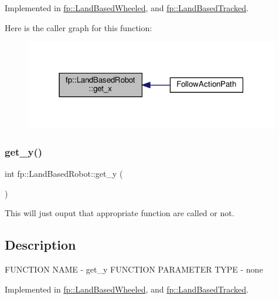 Implemented in \hyperlink{classfp_1_1_land_based_wheeled_a75cb4df0270397db3a019f1abc694cf9}{fp\+::\+Land\+Based\+Wheeled}, and \hyperlink{classfp_1_1_land_based_tracked_a3a4fc3c84dd3fcf1928a27af1658680f}{fp\+::\+Land\+Based\+Tracked}.

Here is the caller graph for this function\+:
\nopagebreak
\begin{figure}[H]
\begin{center}
\leavevmode
\includegraphics[width=315pt]{classfp_1_1_land_based_robot_a3624c5d041de0987c0103c6b01fa9bc6_icgraph}
\end{center}
\end{figure}
\mbox{\label{classfp_1_1_land_based_robot_ae742797bee07ac5b92bfe934cbfed6e9}} 
\subsubsection{\texorpdfstring{get\+\_\+y()}{get\_y()}}
{\footnotesize\ttfamily int fp\+::\+Land\+Based\+Robot\+::get\+\_\+y (\begin{DoxyParamCaption}{ }\end{DoxyParamCaption})\hspace{0.3cm}{\ttfamily [pure virtual]}}



This will just ouput that appropriate function are called or not. 

\hypertarget{main_8cpp_Description}{}\subsection{Description}\label{main_8cpp_Description}
F\+U\+N\+C\+T\+I\+ON N\+A\+ME -\/ get\+\_\+y F\+U\+N\+C\+T\+I\+ON P\+A\+R\+A\+M\+E\+T\+ER T\+Y\+PE -\/ none 

Implemented in \hyperlink{classfp_1_1_land_based_wheeled_ae793757fd11ba270a6d9c335acb8cafd}{fp\+::\+Land\+Based\+Wheeled}, and \hyperlink{classfp_1_1_land_based_tracked_a09738928390e7e0d33444b6a7cfcc841}{fp\+::\+Land\+Based\+Tracked}.

